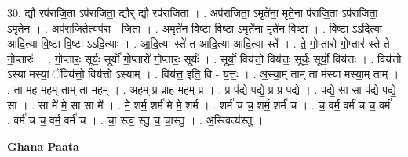 \documentclass[17pt]{extarticle}
\begin{document}
30. द्यौ रप॑राजि॒ता ऽप॑राजिता॒ द्यौर् द्यौ रप॑राजिता । . अप॑राजिता॒ ऽमृते॑ना॒ मृते॒ना प॑राजि॒ता ऽप॑राजिता॒ ऽमृते॑न । . अप॑राजि॒तेत्यप॑रा - जि॒ता॒ । . अ॒मृते॑न वि॒ष्टा वि॒ष्टा ऽमृते॑ना॒ मृते॑न वि॒ष्टा । . वि॒ष्टा ऽऽदि॒त्या आ॑दि॒त्या वि॒ष्टा वि॒ष्टा ऽऽदि॒त्याः । . आ॒दि॒त्या स्ते॑ त आदि॒त्या आ॑दि॒त्या स्ते᳚ । . ते॒ गो॒प्तारो॑ गो॒प्तार॑ स्ते ते गो॒प्तारः॑ । . गो॒प्तारः॒ सूर्यः॒ सूर्यो॑ गो॒प्तारो॑ गो॒प्तारः॒ सूर्यः॑ । . सूर्यो॒ विय॑त्तो॒ विय॑त्तः॒ सूर्यः॒ सूर्यो॒ विय॑त्तः । . विय॑त्तो ऽस्या मस्यां॒ ॅविय॑त्तो॒ विय॑त्तो ऽस्याम् । . विय॑त्त॒ इति॒ वि - य॒त्तः॒ । . अ॒स्या॒म् ताम् ता म॑स्या मस्या॒म् ताम् । . ता म॒ह म॒हम् ताम् ता म॒हम् । . अ॒हम् प्र प्राह म॒हम् प्र । . प्र प॑द्ये पद्ये॒ प्र प्र प॑द्ये । . प॒द्ये॒ सा सा प॑द्ये पद्ये॒ सा । . सा मे॑ मे॒ सा सा मे᳚ । . मे॒ शर्म॒ शर्म॑ मे मे॒ शर्म॑ । . शर्म॑ च च॒ शर्म॒ शर्म॑ च । . च॒ वर्म॒ वर्म॑ च च॒ वर्म॑ । . वर्म॑ च च॒ वर्म॒ वर्म॑ च । . चा॒ स्त्व॒ स्तु॒ च॒ चा॒स्तु॒ । . अ॒स्त्वित्य॑स्तु । \newline

\textbf{Ghana Paata } \newline
\end{document}
